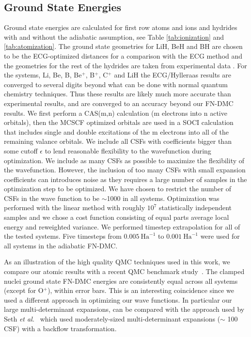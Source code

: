 \documentclass[pra,superscriptaddress,groupedaddress,twocolumn]{revtex4}
\begin{document}
\subsection{Ground State Energies}
Ground state energies are calculated for first row atoms and ions and hydrides with and without the adiabatic assumption, see Table \ref{tab:ionization} and \ref{tab:atomization}. The ground state geometries for LiH, BeH and BH are chosen to be the ECG-optimized distances for a comparison with the ECG method and the geometries for the rest of the hydrides are taken from experimental data \cite{CCCBDB}. For the systems, Li, Be, B, Be$^+$, B$^+$, C$^+$ and LiH the ECG/Hylleraas results are converged to several digits beyond what can be done with normal quantum chemistry techniques.  Thus these results are likely much more accurate than experimental results, and are converged to an accuracy beyond our FN-DMC results.   %
   We first perform a CAS(m,n) calculation (m electrons into n active orbitals), then the MCSCF optimized orbitals are used in a SOCI calculation that includes single and double excitations of the m electrons into all of the remaining valance orbitals. We include all CSFs with coefficients bigger than some cutoff $\epsilon$ to lend reasonable flexibility to the wavefunction during optimization. We include as many CSFs as possible to maximize the flexibility of the wavefunction. However, the inclusion of too many CSFs with small expansion coefficients can introduces noise as they requires a large number of samples in the optimization step to be optimized. We have chosen to restrict the number of CSFs in the wave function to be $\sim$1000 in all systems. Optimization was performed with the linear method with roughly $10^7$ statistically independent samples and we chose a cost function consisting of equal parts average local energy and reweighted variance. We performed timestep extrapolation for all of the tested systems. Five timesteps from $0.005~\text{Ha}^{-1}$ to $0.001~\text{Ha}^{-1}$ were used for all systems in the adiabatic FN-DMC.

As an illustration of the high quality QMC techniques used in this work, we compare our atomic results with a recent QMC benchmark study~\cite{Seth_Bench}.  The clamped nuclei ground state FN-DMC energies  are consistently equal across all systems (except for O$^{+}$), within error bars. This is an interesting coincidence since we used a different approach in optimizing our wave functions.   In particular our large multi-determinant expansions, can be compared with the approach used by Seth {\it et al.}~\cite{Seth_Bench} which used moderately-sized multi-determinant expansions ($\sim$ 100 CSF) with a backflow transformation.   
 
\end{document}
